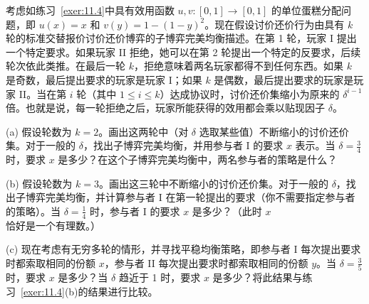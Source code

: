\begin{exercise}\label{exer:11.5}
考虑如练习~\ref{exer:11.4}中具有效用函数 \(u,v : \left\lbrack  {0,1}\right\rbrack   \rightarrow  \left\lbrack  {0,1}\right\rbrack\) 的单位蛋糕分配问题，即 \(u\left( x\right)  = x\) 和 \(v\left( y\right)  = 1 - {\left( 1 - y\right) }^{2}\)。现在假设讨价还价行为由具有 \(k\) 轮的标准交替报价讨价还价博弈的子博弈完美均衡描述。在第 1 轮，玩家 I 提出一个特定要求。如果玩家 II 拒绝，她可以在第 2 轮提出一个特定的反要求，后续轮次依此类推。在最后一轮 \(k\)，拒绝意味着两名玩家都得不到任何东西。如果 \(k\) 是奇数，最后提出要求的玩家是玩家 I；如果 \(k\) 是偶数，最后提出要求的玩家是玩家 II。当在第 \(i\) 轮（其中 \(1 \leq  i \leq  k\)）达成协议时，讨价还价集缩小为原来的 \({\delta }^{i - 1}\) 倍。也就是说，每一轮拒绝之后，玩家所能获得的效用都会乘以贴现因子 \(\delta\)。

(a) 假设轮数为 \(k = 2\)。画出这两轮中（对 \(\delta\) 选取某些值）不断缩小的讨价还价集。对于一般的 \(\delta\)，找出子博弈完美均衡，并用参与者 I 的要求 \(x\) 表示。当 \(\delta  = \frac{3}{4}\) 时，要求 \(x\) 是多少？在这个子博弈完美均衡中，两名参与者的策略是什么？


(b) 假设轮数为 \(k = 3\)。画出这三轮中不断缩小的讨价还价集。对于一般的 \(\delta\)，找出子博弈完美均衡，并计算参与者 I 在第一轮提出的要求（你不需要指定参与者的策略）。当 \(\delta  = \frac{1}{4}\) 时，参与者 I 的要求 \(x\) 是多少？（此时 \(x\) 恰好是一个有理数。）


(c) 现在考虑有无穷多轮的情形，并寻找平稳均衡策略，即参与者 I 每次提出要求时都索取相同的份额 \(x\)，参与者 II 每次提出要求时都索取相同的份额 \(y\)。当 \(\delta  = \frac{3}{5}\) 时，要求 \(x\) 是多少？当 \(\delta\) 趋近于 1 时，要求 \(x\) 是多少？将此结果与练习~\ref{exer:11.4}(b)的结果进行比较。
\end{exercise}
